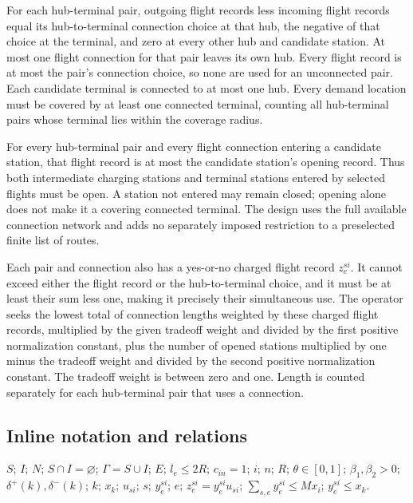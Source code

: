 \documentclass[10pt]{article}
\begin{document}
For each hub-terminal pair, outgoing flight records less incoming flight records equal its hub-to-terminal connection choice at that hub, the negative of that choice at the terminal, and zero at every other hub and candidate station. At most one flight connection for that pair leaves its own hub. Every flight record is at most the pair's connection choice, so none are used for an unconnected pair. Each candidate terminal is connected to at most one hub. Every demand location must be covered by at least one connected terminal, counting all hub-terminal pairs whose terminal lies within the coverage radius.

For every hub-terminal pair and every flight connection entering a candidate station, that flight record is at most the candidate station's opening record. Thus both intermediate charging stations and terminal stations entered by selected flights must be open. A station not entered may remain closed; opening alone does not make it a covering connected terminal. The design uses the full available connection network and adds no separately imposed restriction to a preselected finite list of routes.

Each pair and connection also has a yes-or-no charged flight record $z_e^{si}$. It cannot exceed either the flight record or the hub-to-terminal choice, and it must be at least their sum less one, making it precisely their simultaneous use. The operator seeks the lowest total of connection lengths weighted by these charged flight records, multiplied by the given tradeoff weight and divided by the first positive normalization constant, plus the number of opened stations multiplied by one minus the tradeoff weight and divided by the second positive normalization constant. The tradeoff weight is between zero and one. Length is counted separately for each hub-terminal pair that uses a connection.

\subsection*{Inline notation and relations}
$S$; $I$; $N$; $S\cap I=\varnothing$; $\Gamma=S\cup I$; $E$; $l_e\le2R$; $c_{in}=1$; $i$; $n$; $R$; $\theta\in[0,1]$; $\beta_1,\beta_2>0$; $\delta^+(k),\delta^-(k)$; $k$; $x_k$; $u_{si}$; $s$; $y_e^{si}$; $e$; $z_e^{si}=y_e^{si}u_{si}$; $\sum_{s,e}y_e^{si}\le Mx_i$; $y_e^{si}\le x_k$.
\end{document}
